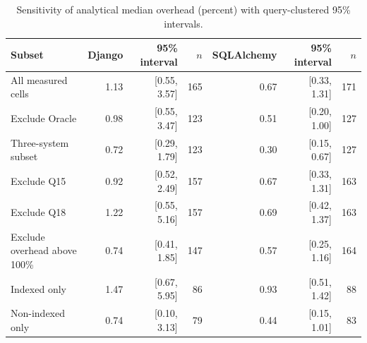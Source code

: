 \begin{table}[!t]
\caption{Sensitivity of analytical median overhead (percent) with query-clustered 95\% intervals.}\label{tab:sensitivity}
\centering\small\renewcommand{\arraystretch}{1.15}
\begin{tabular}{lrr rrrr}\toprule
Subset & Django & 95\% interval & $n$ & SQLAlchemy & 95\% interval & $n$ \\\midrule
All measured cells & 1.13 & [0.55, 3.57] & 165 & 0.67 & [0.33, 1.31] & 171 \\
Exclude Oracle & 0.98 & [0.55, 3.47] & 123 & 0.51 & [0.20, 1.00] & 127 \\
Three-system subset & 0.72 & [0.29, 1.79] & 123 & 0.30 & [0.15, 0.67] & 127 \\
Exclude Q15 & 0.92 & [0.52, 2.49] & 157 & 0.67 & [0.33, 1.31] & 163 \\
Exclude Q18 & 1.22 & [0.55, 5.16] & 157 & 0.69 & [0.42, 1.37] & 163 \\
Exclude overhead above 100\% & 0.74 & [0.41, 1.85] & 147 & 0.57 & [0.25, 1.16] & 164 \\
Indexed only & 1.47 & [0.67, 5.95] & 86 & 0.93 & [0.51, 1.42] & 88 \\
Non-indexed only & 0.74 & [0.10, 3.13] & 79 & 0.44 & [0.15, 1.01] & 83 \\
\bottomrule\end{tabular}\end{table}
